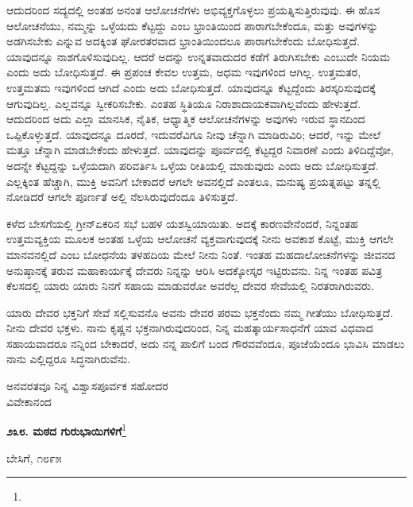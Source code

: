 ಆದುದರಿಂದ ಸದ್ಯದಲ್ಲಿ ಅಂತಹ ಅನಂತ ಆಲೋಚನೆಗಳು ಅಭಿವ್ಯಕ್ತಗೊಳ್ಳಲು ಪ್ರಯತ್ನಿಸುತ್ತಿರುವುವು. ಈ ಹೊಸ ಆಲೋಚನೆಯು, ನಮ್ಮನ್ನು ಒಳ್ಳೆಯದು ಕೆಟ್ಟದ್ದು ಎಂಬ ಭ್ರಾಂತಿಯಿಂದ ಪಾರಾಗಬೇಕೆಂದೂ, ಮತ್ತು ಅವುಗಳನ್ನು ಅಡಗಿಸಬೇಕು ಎನ್ನುವ ಅದಕ್ಕಿಂತ ಘೋರತರವಾದ ಭ್ರಾಂತಿಯಿಂದಲೂ ಪಾರಾಗಬೇಕೆಂದು ಬೋಧಿಸುತ್ತದೆ. ಯಾವುದನ್ನೂ ನಾಶಗೊಳಿಸುವುದಿಲ್ಲ. ಆದರೆ ಅದನ್ನು ಉನ್ನತವಾದುದರ ಕಡೆಗೆ ತಿರುಗಿಸಬೇಕು ಎಂಬುದೇ ನಿಯಮ ಎಂದು ಅದು ಬೋಧಿಸುತ್ತದೆ. ಈ ಪ್ರಪಂಚ ಕೇವಲ ಉತ್ತಮ, ಅಧಮ ಇವುಗಳಿಂದ ಆಗಿಲ್ಲ. ಉತ್ತಮತರ, ಉತ್ತಮತಮ ಇವುಗಳಿಂದ ಆಗಿದೆ ಎಂದು ಅದು ಬೋಧಿಸುತ್ತದೆ. ಯಾವುದನ್ನೂ ಕೆಟ್ಟದ್ದೆಂದು ತಿರಸ್ಕರಿಸುವುದಕ್ಕೆ ಆಗುವುದಿಲ್ಲ. ಎಲ್ಲವನ್ನೂ ಸ್ವೀಕರಿಸಬೇಕು. ಎಂತಹ ಸ್ಥಿತಿಯೂ ನಿರಾಶಾದಾಯಕವಾಗಿಲ್ಲವೆಂದು ಹೇಳುತ್ತದೆ. ಆದುದರಿಂದ ಅದು ಎಲ್ಲಾ ಮಾನಸಿಕ, ನೈತಿಕ, ಆಧ್ಯಾತ್ಮಿಕ ಆಲೋಚನೆಗಳನ್ನು ಅವುಗಳು ಇರುವ ಸ್ಥಾನದಿಂದ ಒಪ್ಪಿಕೊಳ್ಳುತ್ತದೆ. ಯಾವುದನ್ನೂ ದೂರದೆ, ಇದುವರೆವಿಗೂ ನೀವು ಚೆನ್ನಾಗಿ ಮಾಡಿರುವಿರಿ; ಆದರೆ, ಇನ್ನು ಮೇಲೆ ಮತ್ತೂ ಚೆನ್ನಾಗಿ ಮಾಡಬೇಕೆಂದು ಹೇಳುತ್ತದೆ. ಯಾವುದನ್ನು ಪೂರ್ವದಲ್ಲಿ ಕೆಟ್ಟದ್ದರ ನಿವಾರಣೆ ಎಂದು ತಿಳಿದಿದ್ದೆವೋ, ಅದನ್ನೇ ಕೆಟ್ಟದ್ದನ್ನು ಒಳ್ಳೆಯದಾಗಿ ಪರಿವರ್ತಿಸಿ ಒಳ್ಳೆಯ ರೀತಿಯಲ್ಲಿ ಮಾಡುವುದು ಎಂದು ಅದು ಬೋಧಿಸುತ್ತದೆ. ಎಲ್ಲಕ್ಕಿಂತ ಹೆಚ್ಚಾಗಿ, ಮುಕ್ತಿ ಅವನಿಗೆ ಬೇಕಾದರೆ ಆಗಲೇ ಅವನಲ್ಲಿದೆ ಎಂತಲೂ, ಮನುಷ್ಯ ಪ್ರಯತ್ನಪಟ್ಟು ತನ್ನಲ್ಲಿ ನೋಡಿದರೆ ಆಗಲೇ ಪೂರ್ಣತೆ ಅಲ್ಲಿ ನೆಲಸಿರುವುದೆಂದೂ ತಿಳಿಸುತ್ತದೆ.

ಕಳೆದ ಬೇಸಗೆಯಲ್ಲಿ ಗ್ರೀನ್‌ಏಕರಿನ ಸಭೆ ಬಹಳ ಯಶಸ್ವಿಯಾಯಿತು. ಅದಕ್ಕೆ ಕಾರಣವೇನೆಂದರೆ, ನಿನ್ನಂತಹ ಉತ್ತಮವ್ಯಕ್ತಿಯ ಮೂಲಕ ಅಂತಹ ಒಳ್ಳೆಯ ಆಲೋಚನೆ ವ್ಯಕ್ತವಾಗುವುದಕ್ಕೆ ನೀನು ಅವಕಾಶ ಕೊಟ್ಟೆ, ಮುಕ್ತಿ ಆಗಲೇ ಮಾನವನಲ್ಲಿದೆ ಎಂಬ ಬೋಧನೆಯ ತಳಹದಿಯ ಮೇಲೆ ನೀನು ನಿಂತೆ. ಇಂತಹ ಮಹದಾಲೋಚನೆಗಳನ್ನು ಜೀವನದ ಅನುಷ್ಠಾನಕ್ಕೆ ತರುವ ಮಹಾಕಾರ್ಯಕ್ಕೆ ದೇವರು ನಿನ್ನನ್ನು ಆರಿಸಿ ಅದಕ್ಕೋಸ್ಕರ ಇಟ್ಟಿರುವನು. ನಿನ್ನ ಇಂತಹ ಪವಿತ್ರ ಕೆಲಸದಲ್ಲಿ ಯಾರು ಯಾರು ನಿನಗೆ ಸಹಾಯ ಮಾಡುವರೋ ಅವರೆಲ್ಲ ದೇವರ ಸೇವೆಯಲ್ಲಿ ನಿರತರಾಗಿರುವರು.

\newpage

ಯಾರು ದೇವರ ಭಕ್ತನಿಗೆ ಸೇವೆ ಸಲ್ಲಿಸುವನೊ ಅವನು ದೇವರ ಪರಮ ಭಕ್ತನೆಂದು ನಮ್ಮ ಗೀತೆಯು ಬೋಧಿಸುತ್ತದೆ. ನೀನು ದೇವರ ಭಕ್ತಳು. ನಾನು ಕೃಷ್ಣನ ಭಕ್ತನಾಗಿರುವುದರಿಂದ, ನಿನ್ನ ಮಹತ್ಕಾರ್ಯಸಾಧನೆಗೆ ಯಾವ ವಿಧವಾದ ಸಹಾಯವಾದರೂ ನನ್ನಿಂದ ಬೇಕಾದರೆ, ಅದು ನನ್ನ ಪಾಲಿಗೆ ಬಂದ ಗೌರವವೆಂದೂ, ಪೂಜೆಯೆಂದೂ ಭಾವಿಸಿ ಮಾಡಲು ನಾನು ಎಲ್ಲಿದ್ದರೂ ಸಿದ್ಧನಾಗಿರುವೆನು.

\vspace{-0.5cm}

{\flushright
ಅನವರತವೂ ನಿನ್ನ ವಿಶ್ವಾಸಪೂರ್ವಕ ಸಹೋದರ\\ವಿವೇಕಾನಂದ\par}

\begin{center}
\textbf{೨೩೮. ಮಠದ ಗುರುಭಾಯಿಗಳಿಗೆ}\footnote{}
\end{center}

\vspace{-0.5cm}

\begin{flushright}
ಬೇಸಿಗೆ, ೧೮೯೫
\end{flushright}

